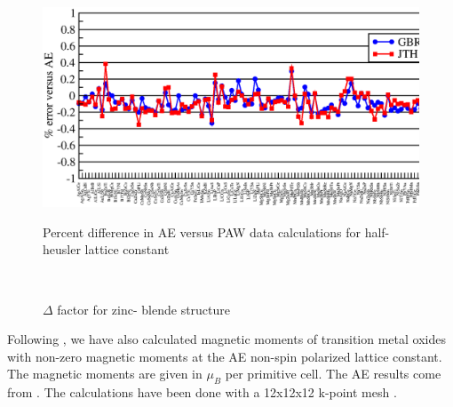 \documentclass[10pt]{revtex4}
\begin{document}
\begin{figure}[H]
\begin{center}
{\resizebox{6.0cm}{!}
{\includegraphics[angle=-90]{fig-hh.eps}}}\\
\caption{Percent difference in AE versus PAW data calculations for half-heusler lattice constant}
\label{fig5}
\end{center}
\end{figure}


\begin{figure}[H]
\begin{center}
{\resizebox{13.0cm}{!}
{}} \\
\caption{$\Delta$ factor for zinc- blende structure}
\label{fig6}
\end{center}
\end{figure}

Following \cite{web5}, we have also calculated magnetic moments of transition metal oxides with non-zero magnetic moments at the AE non-spin polarized lattice constant. The magnetic moments are given in $\mu_B$ per primitive cell. The AE results come from \cite{web5}. The calculations have been done with a 12x12x12 k-point mesh \label{tab2}.\\
\end{document}
